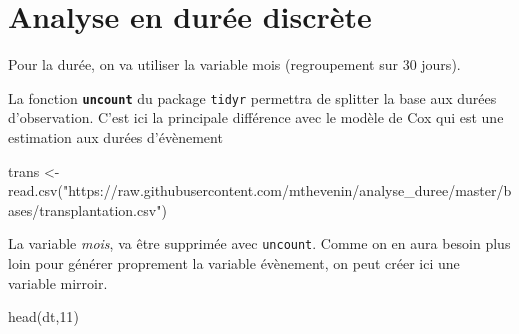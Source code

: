 \documentclass[
  12pt,
  letterpaper,
  DIV=11,
  numbers=noendperiod,
  onepage,
  openany]{scrreprt}
\newenvironment{Shaded}{\begin{snugshade}}{\end{snugshade}}
\newcommand{\DecValTok}[1]{\textcolor[rgb]{0.86,0.86,0.80}{#1}}
\newcommand{\FunctionTok}[1]{\textcolor[rgb]{0.94,0.94,0.56}{#1}}
\newcommand{\NormalTok}[1]{\textcolor[rgb]{0.80,0.80,0.80}{#1}}
\newcommand{\OtherTok}[1]{\textcolor[rgb]{0.94,0.94,0.56}{#1}}
\newcommand{\SpecialCharTok}[1]{\textcolor[rgb]{0.86,0.64,0.64}{#1}}
\newcommand{\StringTok}[1]{\textcolor[rgb]{0.80,0.58,0.58}{#1}}
\begin{document}
\hypertarget{analyse-en-duruxe9e-discruxe8te}{%
\section{\texorpdfstring{\textbf{Analyse en durée
discrète}}{Analyse en durée discrète}}\label{analyse-en-duruxe9e-discruxe8te}}

Pour la durée, on va utiliser la variable mois (regroupement sur 30
jours).

La fonction \textbf{\texttt{uncount}} du package \texttt{tidyr}
permettra de splitter la base aux durées d'observation. C'est ici la
principale différence avec le modèle de Cox qui est une estimation aux
durées d'évènement

\begin{Shaded}
\begin{Highlighting}[]
\NormalTok{trans }\OtherTok{\textless{}{-}} \FunctionTok{read.csv}\NormalTok{(}\StringTok{"https://raw.githubusercontent.com/mthevenin/analyse\_duree/master/bases/transplantation.csv"}\NormalTok{)}
\end{Highlighting}
\end{Shaded}

La variable \emph{mois}, va être supprimée avec \texttt{uncount}. Comme
on en aura besoin plus loin pour générer proprement la variable
évènement, on peut créer ici une variable mirroir.

\begin{Shaded}
\end{Shaded}

\begin{Shaded}
\end{Shaded}

\begin{Shaded}
\begin{Highlighting}[]
\FunctionTok{head}\NormalTok{(dt,}\DecValTok{11}\NormalTok{) }
\end{Highlighting}
\end{Shaded}
\end{document}
